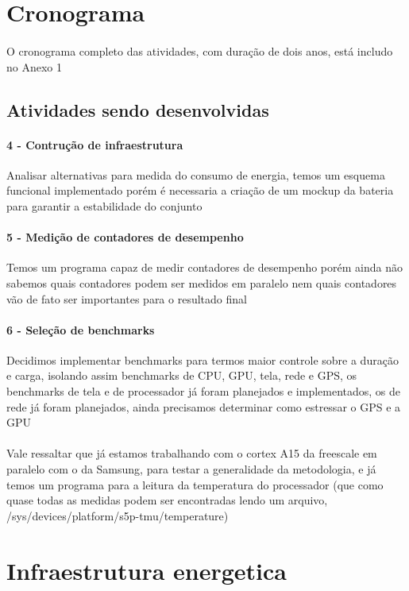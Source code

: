 \documentclass[11pt,a4paper,titlepage]{article}
\begin{document}
\section{Cronograma}
\paragraph{} O cronograma completo das atividades, com duração de dois anos, está includo no Anexo 1
\subsection{Atividades sendo desenvolvidas}
\paragraph{4 - Contrução de infraestrutura} Analisar alternativas para medida do 
consumo de energia, temos um esquema funcional implementado porém é necessaria a criação de um mockup da bateria para garantir a estabilidade do conjunto 
\paragraph{5 - Medição de contadores de desempenho} Temos um programa capaz de medir contadores de desempenho porém ainda não sabemos quais contadores podem ser medidos em paralelo nem quais contadores vão de fato ser importantes para o resultado final
\paragraph{6 - Seleção de benchmarks} Decidimos implementar benchmarks para termos maior controle sobre a duração e carga, isolando assim benchmarks de CPU, GPU, tela, rede e GPS, os benchmarks de tela e de processador já foram planejados e implementados, os de rede já foram planejados, ainda precisamos determinar como estressar o GPS e a GPU
\paragraph{} Vale ressaltar que já estamos trabalhando com o cortex A15 da freescale em paralelo com o da Samsung, para testar a generalidade da metodologia, e já temos um programa para a leitura da temperatura do processador (que como quase todas as medidas podem ser encontradas lendo um arquivo, /sys/devices/platform/s5p-tmu/temperature)
\section{Infraestrutura energetica}
\end{document}
